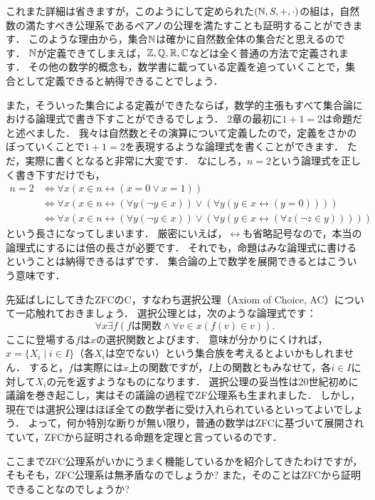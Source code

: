 \documentclass[./main]{subfiles}
\begin{document}
これまた詳細は省きますが，このようにして定められた$(\mathbb{N}, S, +, \cdot)$の組は，自然数の満たすべき公理系であるペアノの公理を満たすことも証明することができます．
このような理由から，集合$\mathbb{N}$は確かに自然数全体の集合だと思えるのです．
$\mathbb{N}$が定義できてしまえば，$\mathbb{Z}, \mathbb{Q}, \mathbb{R}, \mathbb{C}$などは全く普通の方法で定義されます．
その他の数学的概念も，数学書に載っている定義を追っていくことで，集合として定義できると納得できることでしょう．

また，そういった集合による定義ができたならば，数学的主張もすべて集合論における論理式で書き下すことができるでしょう．
2章の最初に$1+1=2$は命題だと述べました．
我々は自然数とその演算について定義したので，定義をさかのぼっていくことで$1+1=2$を表現するような論理式を書くことができます．
ただ，実際に書くとなると非常に大変です．
なにしろ，$n=2$という論理式を正しく書き下すだけでも，
\begin{align*}
n=2 &\iff \forall x(x\in n\leftrightarrow (x=0 \lor x=1))\\
&\iff \forall x(x\in n\leftrightarrow (\forall y(\neg y\in x))\lor (\forall y(y\in x\leftrightarrow (y = 0))))\\
&\iff \forall x(x\in n\leftrightarrow (\forall y(\neg y\in x))\lor (\forall y(y\in x\leftrightarrow (\forall z(\neg z\in y)))))
\end{align*}
という長さになってしまいます．
厳密にいえば，$\leftrightarrow$も省略記号なので，本当の論理式にするには倍の長さが必要です．
それでも，命題はみな論理式に書けるということは納得できるはずです．
集合論の上で数学を展開できるとはこういう意味です．


先延ばしにしてきたZFCのC，すなわち選択公理（Axiom of Choice, AC）について一応触れておきましょう．
選択公理とは，次のような論理式です：
\[
\forall x\exists f(f\text{は関数}\land\forall v\in x(f(v)\in v)).
\]
ここに登場する$f$は$x$の選択関数とよびます．
意味が分かりにくければ，$x=\{X_i \mid i\in I\}$（各$X_i$は空でない）という集合族を考えるとよいかもしれません．
すると，$f$は実際には$x$上の関数ですが，$I$上の関数ともみなせて，各$i\in I$に対して$X_i$の元を返すようなものになります．
選択公理の妥当性は20世紀初めに議論を巻き起こし，実はその議論の過程でZF公理系も生まれました．
しかし，現在では選択公理はほぼ全ての数学者に受け入れられているといってよいでしょう．
よって，何か特別な断りが無い限り，普通の数学はZFCに基づいて展開されていて，ZFCから証明される命題を定理と言っているのです．


ここまでZFC公理系がいかにうまく機能しているかを紹介してきたわけですが，そもそも，ZFC公理系は無矛盾なのでしょうか?
また，そのことはZFCから証明できることなのでしょうか?
\end{document}
